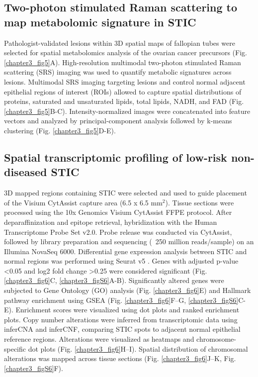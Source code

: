 \begin{refsection}
    \subsection{Two-photon stimulated Raman scattering to map metabolomic signature in STIC}
    Pathologist-validated lesions within 3D spatial maps of fallopian tubes were selected for spatial metabolomics analysis of the ovarian cancer precursors (Fig. \ref{chapter3_fig5}A). High-resolution multimodal two-photon stimulated Raman scattering (SRS) imaging was used to quantify metabolic signatures across lesions\cite{Zhang2024Multi}. Multimodal SRS imaging targeting lesions and control normal adjacent epithelial regions of interest (ROIs) allowed to capture spatial distributions of proteins, saturated and unsaturated lipids, total lipids, NADH, and FAD (Fig. \ref{chapter3_fig5}B-C). Intensity-normalized images were concatenated into feature vectors and analyzed by principal-component analysis followed by k-means clustering (Fig. \ref{chapter3_fig5}D-E)\cite{Ikotun2023K}.
    
    \subsection{Spatial transcriptomic profiling of low-risk non-diseased STIC }
    3D mapped regions containing STIC were selected and used to guide placement of the Visium CytAssist capture area (6.5 x 6.5 mm$^2$). Tissue sections were processed using the 10x Genomics Visium CytAssist FFPE protocol. After deparaffinization and epitope retrieval, hybridization with the Human Transcriptome Probe Set v2.0. Probe release was conducted via CytAssist, followed by library preparation and sequencing (~250 million reads/sample) on an Illumina NovaSeq 6000\cite{Johnson2025Human,Bell2024PanIN}.
    Differential gene expression analysis between STIC and normal regions was performed using Seurat v5 \cite{Hao2024Dictionary}. Genes with adjusted p-value <0.05 and log2 fold change >0.25 were considered significant (Fig. \ref{chapter3_fig6}C, \ref{chapter3_figS6}A-B). Significantly altered genes were subjected to Gene Ontology (GO) analysis (Fig.  \ref{chapter3_fig6}E) and Hallmark pathway enrichment using GSEA (Fig. \ref{chapter3_fig6}F–G, \ref{chapter3_figS6}C-E)\cite{Subramanian2005Gene,Ashburner2000Gene,Aleksander2023Gene}. Enrichment scores were visualized using dot plots and ranked enrichment plots. Copy number alterations were inferred from transcriptomic data using inferCNA and inferCNF, comparing STIC spots to adjacent normal epithelial reference regions\cite{Patel2014Single,Timothyinfercnv}. Alterations were visualized as heatmaps and chromosome-specific dot plots (Fig.  \ref{chapter3_fig6}H–I). Spatial distribution of chromosomal alterations was mapped across tissue sections (Fig. \ref{chapter3_fig6}J–K, Fig. \ref{chapter3_figS6}F).
    

\end{refsection}
